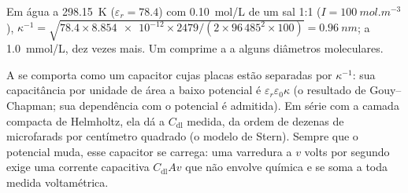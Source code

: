\begin{example}\label{ex:b3:electrode-kinetics:debye}
Em água a \qty{298.15}{K} ($\varepsilon_r = 78.4$) com \qty{0.10}{mol/L} de um sal 1:1 ($I = \qty{100}{mol.m^{-3}}$),
$\kappa^{-1} = \sqrt{78.4 \times \num{8.854e-12} \times 2479/(2 \times 96\,485^2 \times 100)} = \qty{0.96}{nm}$; a \qty{1.0}{mmol/L},
dez vezes mais. Um  comprime a  a alguns diâmetros
moleculares.
\end{example}

A  se comporta como um capacitor cujas placas estão separadas por
$\kappa^{-1}$: sua capacitância por unidade de área a baixo potencial é $\varepsilon_r\varepsilon_0\kappa$ (o
resultado de Gouy--Chapman; sua dependência com o potencial é admitida). Em série
com a camada compacta de Helmholtz, ela dá a $C_{\mathrm{dl}}$ medida, da ordem de dezenas
de microfarads por centímetro quadrado (o modelo de Stern). Sempre que o potencial
muda, esse capacitor se carrega: uma varredura a $v$ volts por segundo exige uma
corrente capacitiva $C_{\mathrm{dl}}Av$ que não envolve química e se soma a toda medida voltamétrica.

